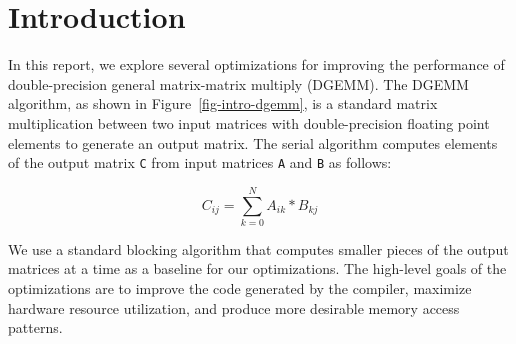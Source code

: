 
\section{Introduction}
\label{sec-intro}



In this report, we explore several optimizations for improving the
performance of double-precision general matrix-matrix multiply
(DGEMM). The DGEMM algorithm, as shown in Figure~\ref{fig-intro-dgemm},
is a standard matrix multiplication between two input matrices with
double-precision floating point elements to generate an output
matrix. The serial algorithm computes elements of the output matrix
{\tt{C}} from input matrices {\tt{A}} and {\tt{B}} as follows:

\[
C_{ij} = \sum_{k=0}^{N}A_{ik}*B_{kj}
\]
\smallskip

We use a standard blocking algorithm that computes smaller pieces of the
output matrices at a time as a baseline for our optimizations. The
high-level goals of the optimizations are to improve the code generated
by the compiler, maximize hardware resource utilization, and produce more
desirable memory access patterns.
\smallskip


